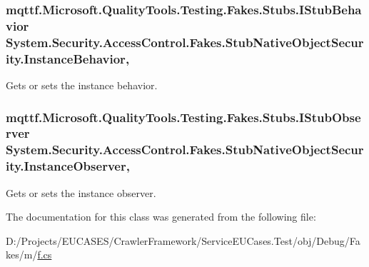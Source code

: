 \hypertarget{class_system_1_1_security_1_1_access_control_1_1_fakes_1_1_stub_native_object_security_a0a53291aa177b5b27ffe5a2820cf875d}{
\subsubsection[{Instance\-Behavior}]{\setlength{\rightskip}{0pt plus 5cm}mqttf.\-Microsoft.\-Quality\-Tools.\-Testing.\-Fakes.\-Stubs.\-I\-Stub\-Behavior System.\-Security.\-Access\-Control.\-Fakes.\-Stub\-Native\-Object\-Security.\-Instance\-Behavior\hspace{0.3cm}{\ttfamily [get]}, {\ttfamily [set]}}}\label{class_system_1_1_security_1_1_access_control_1_1_fakes_1_1_stub_native_object_security_a0a53291aa177b5b27ffe5a2820cf875d}


Gets or sets the instance behavior.

\hypertarget{class_system_1_1_security_1_1_access_control_1_1_fakes_1_1_stub_native_object_security_ad4f029e39639a8b014e64bb450b69e64}{
\subsubsection[{Instance\-Observer}]{\setlength{\rightskip}{0pt plus 5cm}mqttf.\-Microsoft.\-Quality\-Tools.\-Testing.\-Fakes.\-Stubs.\-I\-Stub\-Observer System.\-Security.\-Access\-Control.\-Fakes.\-Stub\-Native\-Object\-Security.\-Instance\-Observer\hspace{0.3cm}{\ttfamily [get]}, {\ttfamily [set]}}}\label{class_system_1_1_security_1_1_access_control_1_1_fakes_1_1_stub_native_object_security_ad4f029e39639a8b014e64bb450b69e64}


Gets or sets the instance observer.



The documentation for this class was generated from the following file\-:\begin{DoxyCompactItemize}
\item 
D\-:/\-Projects/\-E\-U\-C\-A\-S\-E\-S/\-Crawler\-Framework/\-Service\-E\-U\-Cases.\-Test/obj/\-Debug/\-Fakes/m/\hyperlink{m_2f_8cs}{f.\-cs}\end{DoxyCompactItemize}

